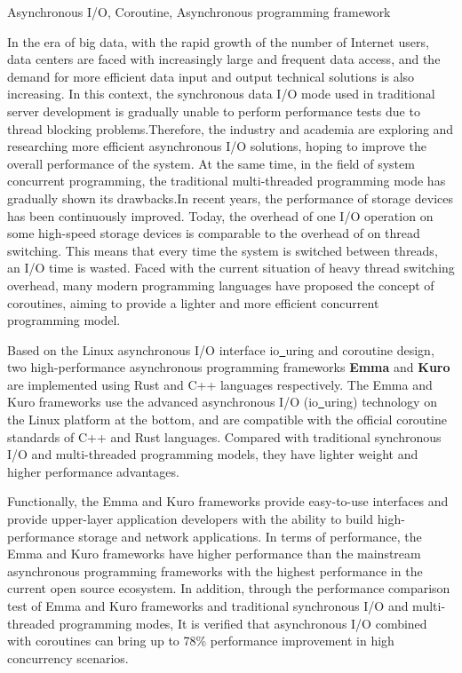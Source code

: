 \documentclass[supercite]{HustGraduPaper}
\theoremstyle{definition}
\begin{document}
\begin{enabstract}{Asynchronous I/O, Coroutine, Asynchronous programming framework}

In the era of big data, with the rapid growth of the number of Internet users, data centers
are faced with increasingly large and frequent data access, and the demand for more efficient
data input and output technical solutions is also increasing. In this context, the synchronous
data I/O mode used in traditional server development is gradually unable to perform performance
tests due to thread blocking problems.Therefore, the industry and academia are exploring and
researching more efficient asynchronous I/O solutions, hoping to improve the overall performance
of the system.
At the same time, in the field of system concurrent programming, the traditional multi-threaded
programming mode has gradually shown its drawbacks.In recent years, the performance of storage
devices has been continuously improved. Today, the overhead of one I/O operation on some high-speed
storage devices is comparable to the overhead of on thread switching. This means that every time
the system is switched between threads, an I/O time is wasted. Faced with the current situation
of heavy thread switching overhead, many modern programming languages have proposed the concept
of coroutines, aiming to provide a lighter and more efficient concurrent programming model.\par

Based on the Linux asynchronous I/O interface io\underline{~}uring and coroutine design,
two high-performance asynchronous programming frameworks \textbf{Emma} and \textbf{Kuro} are implemented using Rust and C++ languages respectively.
The Emma and Kuro frameworks use the advanced asynchronous I/O (io\underline{~}uring) technology on the Linux platform at the bottom,
and are compatible with the official coroutine standards of C++ and Rust languages.
Compared with traditional synchronous I/O and multi-threaded programming models, they have lighter weight and higher performance advantages.\par

Functionally, the Emma and Kuro frameworks provide easy-to-use interfaces and provide upper-layer application developers
with the ability to build high-performance storage and network applications.
In terms of performance, the Emma and Kuro frameworks have higher performance
than the mainstream asynchronous programming frameworks with the highest performance in the current open source ecosystem.
In addition, through the performance comparison test of Emma and Kuro frameworks and traditional synchronous I/O and multi-threaded programming modes,
It is verified that asynchronous I/O combined with coroutines can bring up to 78\% performance improvement in high concurrency scenarios.\par

\end{enabstract}
\end{document}
